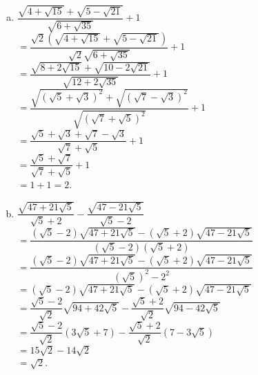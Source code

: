 \begin{bt}
{\begin{enumerate}[a)]
			\item $\dfrac{\sqrt{4+\sqrt{15}}+\sqrt{5-\sqrt{21}}}{\sqrt{6+\sqrt{35}}}+1 $\\
			$= \dfrac{\sqrt{2}(\sqrt{4+\sqrt{15}}+\sqrt{5-\sqrt{21}})}{\sqrt{2}\sqrt{6+\sqrt{35}}}+1 $\\
			$=\dfrac{\sqrt{8+2\sqrt{15}}+\sqrt{10-2\sqrt{21}}}{\sqrt{12+2\sqrt{35}}}+1 $\\
			$=\dfrac{\sqrt{ \left(\sqrt{5}+\sqrt{3} \right) ^2}+\sqrt{\left(\sqrt{7}-\sqrt{3} \right) ^2}}{\sqrt{\left(\sqrt{7}+\sqrt{5} \right) ^2}}+1 $\\
			$=\dfrac{\sqrt{5}+\sqrt{3} +\sqrt{7}-\sqrt{3} }{\sqrt{7}+\sqrt{5} }+1 $\\	
			$=\dfrac{\sqrt{5} +\sqrt{7}}{\sqrt{7}+\sqrt{5} }+1 $\\
			$=1+1=2$.
			\item  $\dfrac{\sqrt{47+21\sqrt{5}}}{\sqrt{5}+2}-\dfrac{\sqrt{47-21\sqrt{5}}}{\sqrt{5}-2} $\\
			$=\dfrac{\left( \sqrt{5}-2\right) \sqrt{47+21\sqrt{5}}-\left( \sqrt{5}+2\right) \sqrt{47-21\sqrt{5}}}{\left( \sqrt{5}-2\right)\left( \sqrt{5}+2\right)}$\\
			$=\dfrac{\left( \sqrt{5}-2\right) \sqrt{47+21\sqrt{5}}-\left( \sqrt{5}+2\right) \sqrt{47-21\sqrt{5}}}{\left( \sqrt{5}\right)^2-2^2}$\\
			$=\left( \sqrt{5}-2\right) \sqrt{47+21\sqrt{5}}-\left( \sqrt{5}+2\right) \sqrt{47-21\sqrt{5}}$\\
			$=\dfrac{\sqrt{5}-2}{\sqrt{2}}  \sqrt{94+42\sqrt{5}}-\dfrac{\sqrt{5}+2}{\sqrt{2}} \sqrt{94-42\sqrt{5}}$\\
			$=\dfrac{\sqrt{5}-2}{\sqrt{2}} \left(3\sqrt{5}+7\right)-\dfrac{\sqrt{5}+2}{\sqrt{2}} \left(7-3\sqrt{5}\right)$\\
			$=15\sqrt{2}-14\sqrt{2}$\\
			$=\sqrt{2}$.
			

\end{enumerate}}
\end{bt}
